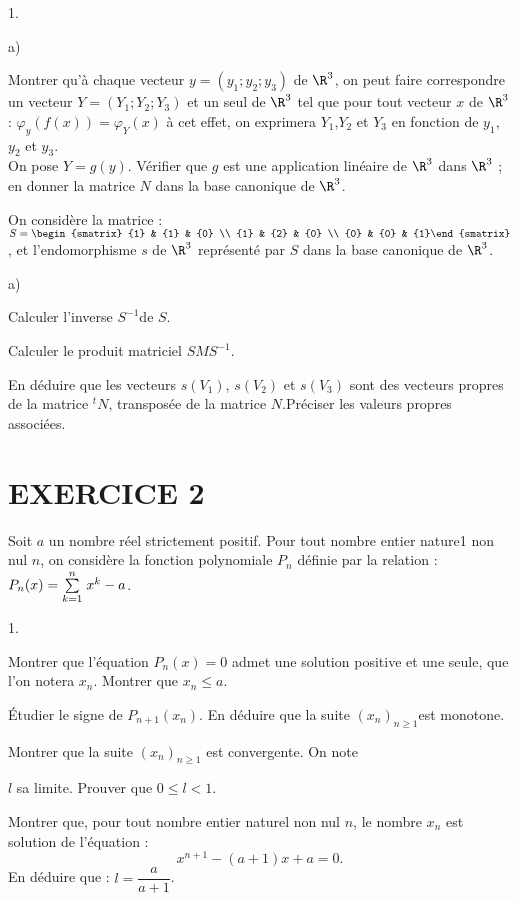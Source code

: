 \documentclass[11pt]{article}%
\begin{document}
\begin{noliste}{1.}
\begin{noliste}{a)}
\item Montrer qu'à chaque vecteur $y = (y_{1};y_{2};y_{3})$ de
$\R^{3}$, on peut faire correspondre un vecteur $Y =
(Y_{1};Y_{2};Y_{3})$ et un seul
de $\R^{3}$ tel que pour tout vecteur $x$ de $\R^{3}$ :
$\varphi_{y}(f(x)) = \varphi_{Y}(x)$ à cet effet, on exprimera
$Y_{1}$,$Y_{2}$
et $Y_{3}$ en fonction de $y_{1}$,$y_{2}$ et $y_{3}$.\\
On pose $Y = g(y)$. Vérifier que $g$ est une application linéaire de
$\R^{3}$ dans $\R^{3}$ ; en donner la matrice $N$ dans la base
canonique de $\R^{3}$.
\end{noliste}

\item On considère la matrice : $S = {{\begin{smatrix}
{1} & {1} & {0} \\
{1} & {2} & {0} \\
{0} & {0} & {1}\end{smatrix}
}}$, et l'endomorphisme $s$ de $\R^{3}$ représenté par $S$ dans la
base canonique de $\R^{3}$.

\begin{noliste}{a)}
 \setlength{\itemsep}{2mm}
\item Calculer l'inverse $S^{-1}$de $S$.

\item Calculer le produit matriciel $SMS^{-1}$.

\item En déduire que les vecteurs $s(V_{1})$, $s(V_{2})$ et $s(V_{3})$
sont
des vecteurs propres de la matrice $^{t}N$, transposée de la matrice
$N.$Préciser les valeurs propres associées.
\end{noliste}
\end{noliste}

\section*{EXERCICE 2}

Soit $a$ un nombre réel strictement positif. Pour tout nombre entier
nature1
non nul $n$, on considère la fonction polynomiale $P_{n}$ définie par
la
relation : $P_{n}(x) = {\textstyle\sum\limits_{k = 1}^{n}}\hspace{.1cm}x^{k}-a$.

\begin{noliste}{1.}
 \setlength{\itemsep}{4mm}
\item Montrer que l'équation $P_{n}(x) = 0$ admet une solution positive
et une
seule, que l'on notera $x_{n}$. Montrer que $x_{n}\leq a$.

\item Étudier le signe de $P_{n + 1}(x_{n})$. En déduire que la suite
$(x_{n})_{n\geq 1}$est monotone.

\item Montrer que la suite $(x_{n})_{n\geq 1}$ est convergente. On note

$l$ sa limite. Prouver que $0\leq l<1$.

\item Montrer que, pour tout nombre entier naturel non nul $n$, le
nombre $x_{n}$ est solution de l'équation : 
\[
x^{n + 1}-(a + 1)x + a = 0.
\]
En déduire que : $l = \dfrac{{a}}{{a + 1}}$.
\end{noliste}
\end{document}
